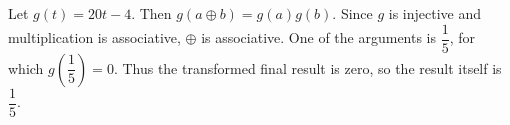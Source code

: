 Let $g(t)=20t-4$. Then $g(a\oplus b)=g(a)g(b)$. Since $g$ is injective and multiplication is associative, $\oplus$ is associative. One of the arguments is $\dfrac{1}{5}$, for which $g(\dfrac{1}{5})=0$. Thus the transformed final result is zero, so the result itself is $\boxed{\dfrac{1}{5}}$.
